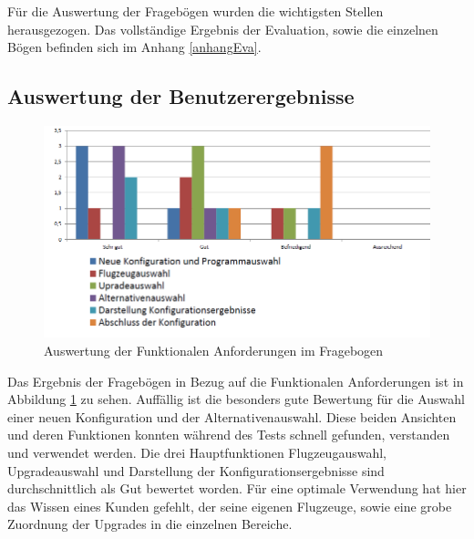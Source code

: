 Für die Auswertung der Fragebögen wurden die wichtigsten Stellen herausgezogen. Das vollständige Ergebnis der Evaluation, sowie die einzelnen Bögen befinden sich im Anhang \ref{anhangEva}.


\subsection{Auswertung der Benutzerergebnisse}
\begin{figure}
\centering
\includegraphics[width=\hsize]{images/bewertung_tablet}
\caption{Auswertung der Funktionalen Anforderungen im Fragebogen}
\label{bewertungTablet}
\end{figure}
Das Ergebnis der Fragebögen in Bezug auf die Funktionalen Anforderungen ist in Abbildung \ref{bewertungTablet} zu sehen. Auffällig ist die besonders gute Bewertung für die Auswahl einer neuen Konfiguration und der Alternativenauswahl. Diese beiden Ansichten und deren Funktionen konnten während des Tests schnell gefunden, verstanden und verwendet werden. Die drei Hauptfunktionen Flugzeugauswahl, Upgradeauswahl und Darstellung der Konfigurationsergebnisse sind durchschnittlich als Gut bewertet worden. Für eine optimale Verwendung hat hier das Wissen eines Kunden gefehlt, der seine eigenen Flugzeuge, sowie eine grobe Zuordnung der Upgrades in die einzelnen Bereiche. \par


